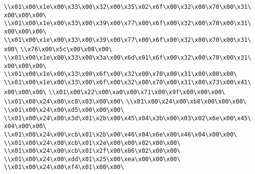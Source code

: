 \verb|\\x01\x00\x1e\x00\x33\x00\x32\x00\x35\x02\x6f\x00\x32\x00\x70\x00\x31\x00\x00\x00\|\newline
\verb|\\x01\x00\x1e\x00\x33\x00\x39\x00\x77\x00\x6f\x00\x32\x00\x70\x00\x31\x00\x00\x00\|\newline
\verb|\\x01\x00\x1e\x00\x33\x00\x39\x00\x77\x00\x6f\x00\x32\x00\x70\x00\x31\x00\|\newline
\verb|\\x76\x00\x5c\x00\x00\x00\|\newline
\verb|\\x01\x00\x1e\x00\x33\x00\x3a\x00\x6d\x01\x6f\x00\x32\x00\x70\x00\x31\x00\x00\x00\|\newline
\verb|\\x01\x00\x1e\x00\x33\x00\x6f\x00\x32\x00\x70\x00\x31\x00\x00\x00\|\newline
\verb|\\x01\x00\x1e\x00\x33\x00\x6f\x00\x32\x00\x70\x00\x31\x00\x73\x00\x41\x00\x00\x00\|\newline
\verb|\\x01\x00\x22\x00\xa0\x00\x71\x00\x9f\x00\x00\x00\|\newline
\verb|\\x01\x00\x24\x00\xc8\x03\x00\x00\|\newline
\verb|\\x01\x00\x24\x00\xb8\x00\x00\x00\|\newline
\verb|\\x01\x00\x24\x00\xd5\x00\x00\x00\|\newline
\verb|\\x01\x00\x24\x00\x3d\x01\x2b\x00\x45\x04\x3b\x00\x03\x02\x6e\x00\x45\x04\x00\x00\|\newline
\verb|\\x01\x00\x24\x00\xcb\x01\x2b\x00\x46\x04\x6e\x00\x46\x04\x00\x00\|\newline
\verb|\\x01\x00\x24\x00\xcb\x01\x2e\x00\x00\x02\x00\x00\|\newline
\verb|\\x01\x00\x24\x00\xcb\x01\x2f\x00\x86\x02\x00\x00\|\newline
\verb|\\x01\x00\x24\x00\xdd\x01\x25\x00\xea\x00\x00\x00\|\newline
\verb|\\x01\x00\x24\x00\xf4\x01\x00\x00\|\newline
